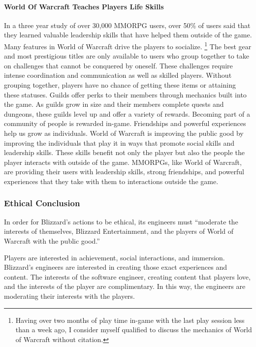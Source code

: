 \documentclass[11pt]{article}
\begin{document}
\begin{multicols}{2}
\paragraph{World Of Warcraft Teaches Players Life Skills\\}
In a three year study of over 30,000 MMORPG users, over 50\% of users said that they learned valuable leadership skills that have helped them outside of the game. \cite{MotivationsAndDerviedExperiences}
Many features in World of Warcraft drive the players to socialize. \footnote{Having over two months of play time in-game with the last play session less than a week ago, I consider myself qualified to discuss the mechanics of World of Warcraft without citation.} The best gear and most prestigious titles are only available to users who group together to take on challenges that cannot be conquered by oneself. These challenges require intense coordination and communication as well as skilled players. Without grouping together, players have no chance of getting these items or attaining these statuses.
Guilds offer perks to their members through mechanics built into the game. As guilds grow in size and their members complete quests and dungeons, these guilds level up and offer a variety of rewards. Becoming part of a community of people is rewarded in-game.
\newline
\newline
Friendships and powerful experiences help us grow as individuals. World of Warcraft is improving the public good by improving the individuals that play it in ways that promote social skills and leadership skills. These skills benefit not only the player but also the people the player interacts with outside of the game. MMORPGs, like World of Warcraft, are providing their users with leadership skills, strong friendships, and powerful experiences that they take with them to interactions outside the game.

\subsubsection{Ethical Conclusion}
In order for Blizzard's actions to be ethical, its engineers must ``moderate the interests of themselves, Blizzard Entertainment, and the players of World of Warcraft with the public good.''

Players are interested in achievement, social interactions, and immersion. Blizzard's engineers are interested in creating those exact experiences and content. The interests of the software engineer, creating content that players love, and the interests of the player are complimentary. In this way, the engineers are moderating their interests with the players.


\end{multicols}
\end{document}
